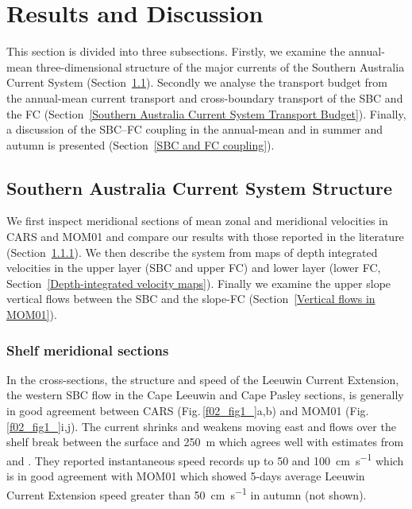 \documentclass[preprint,3p,review,12pt]{elsarticle}
\begin{document}
\section{Results and Discussion} \label{Results and Discussion}
This section is divided into three subsections. Firstly, we examine the annual-mean three-dimensional structure of the major currents of the Southern Australia Current System (Section~\ref{Southern Australia Current System Structure}). Secondly we analyse the transport budget from the annual-mean current transport and cross-boundary transport of the SBC and the FC (Section~\ref{Southern Australia Current System Transport Budget}). Finally, a discussion of the SBC--FC coupling in the annual-mean and in summer and autumn is presented (Section~\ref{SBC and FC coupling}).

\subsection{Southern Australia Current System Structure} \label{Southern Australia Current System Structure}
We first inspect meridional sections of mean zonal and meridional velocities in CARS and MOM01 and compare our results with those reported in the literature (Section~\ref{Shelf meridional sections}). We then describe the system from maps of depth integrated velocities in the upper layer (SBC and upper FC) and lower layer (lower FC, Section~\ref{Depth-integrated velocity maps}). Finally we examine the upper slope vertical flows between the SBC and the slope-FC (Section~\ref{Vertical flows in MOM01}).

\subsubsection{Shelf meridional sections}\label{Shelf meridional sections}
In the cross-sections, the structure and speed of the Leeuwin Current Extension, the western SBC flow in the Cape Leeuwin and Cape Pasley sections, is generally in good agreement between CARS (Fig.\,\ref{f02_fig1_}a,b) and MOM01 (Fig.\,\ref{f02_fig1_}i,j). The current shrinks and weakens moving east and flows over the shelf break between the surface and \SI{250}{\meter} which agrees well with estimates from \citet{Cresswell2004} and \citet{Cresswell1993}. They reported instantaneous speed records up to \num{50} and \SI{100}{\centi\meter\per\second} which is in good agreement with MOM01 which showed 5-days average Leeuwin Current Extension speed greater than \SI{50}{\centi\meter\per\second} in autumn (not shown).
\end{document}
